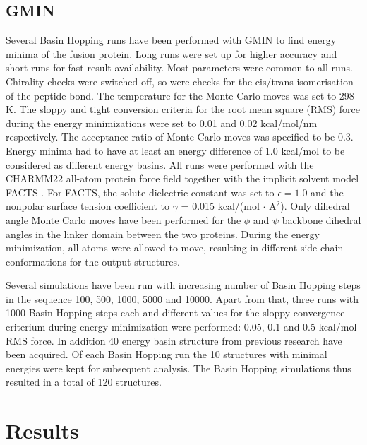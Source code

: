 \documentclass[english, a4paper, 12pt, titlepage, draft]{article}
\begin{document}
\subsection{GMIN}

Several Basin Hopping runs have been performed with GMIN to find energy minima of the fusion protein.
Long runs were set up for higher accuracy and short runs for fast result availability.
Most parameters were common to all runs.
Chirality checks were switched off, so were checks for the cis/trans isomerisation of the peptide bond.
The temperature for the Monte Carlo moves was set to 298 K.
The sloppy and tight conversion criteria for the root mean square (RMS) force during the energy minimizations were set to 0.01 and 0.02 kcal/mol/nm respectively.
The acceptance ratio of Monte Carlo moves was specified to be 0.3.
Energy minima had to have at least an energy difference of 1.0 kcal/mol to be considered as different energy basins.
All runs were performed with the CHARMM22 all-atom protein force field \cite{CHARMM22} together with the implicit solvent model FACTS \cite{FACTS}.
For FACTS, the solute dielectric constant was set to $\epsilon = 1.0$ and the nonpolar surface tension coefficient to $\gamma$ = 0.015 kcal/(mol $\cdot$ A$^2$).
Only dihedral angle Monte Carlo moves have been performed for the $\phi$ and $\psi$ backbone dihedral angles in the linker domain between the two proteins.
During the energy minimization, all atoms were allowed to move, resulting in different side chain conformations for the output structures.

Several simulations have been run with increasing number of Basin Hopping steps in the sequence 100, 500, 1000, 5000 and 10000.
Apart from that, three runs with 1000 Basin Hopping steps each and different values for the sloppy convergence criterium during energy minimization were performed: 0.05, 0.1 and 0.5 kcal/mol RMS force.
In addition 40 energy basin structure from previous research have been acquired.
Of each Basin Hopping run the 10 structures with minimal energies were kept for subsequent analysis.
The Basin Hopping simulations thus resulted in a total of 120 structures.




\section{Results}
\end{document}

